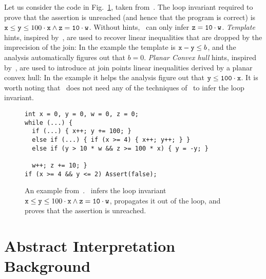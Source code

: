 \documentclass{llncs}
\begin{document}
 Let us consider the code in Fig.~\ref{fig:ex_paperSriramMS}, taken from~\cite{GulavaniEtAl08}.
The loop invariant required to prove that  the assertion  is unreached (and hence that the program is correct) is $\mathtt{x} \leq \mathtt{y} \leq 100 \cdot \mathtt{x} \wedge \mathtt{z} = \mathtt{10} \cdot \mathtt{w}$.
Without hints, \Subpoly\ can only infer  $\mathtt{z} = \mathtt{10 \cdot w}$.
\emph{Template} hints, inspired by~\cite{Sankaranarayanan05}, are used to recover linear inequalities that are dropped by the imprecision of the join: In the example the template is $\mathtt{x} - \mathtt{y} \leq b$, and the analysis automatically figures out that $b = 0$.
\emph{Planar Convex hull} hints, inspired by~\cite{SimonKing02-2}, are used to introduce at join points linear inequalities derived by a planar convex hull: In the example it helps the analysis figure out that $\mathtt{y} \leq \mathtt{100} \cdot \mathtt{x}$.
It is worth noting that \Subpoly\ does not need any of the techniques of~\cite{GulavaniEtAl08} to infer the loop invariant.

\begin{figure}[t]
{
\small
\begin{verbatim}
int x = 0, y = 0, w = 0, z = 0;
while (...) {
  if (...) { x++; y += 100; }
  else if (...) { if (x >= 4) { x++; y++; } }
  else if (y > 10 * w && z >= 100 * x) { y = -y; }
        
  w++; z += 10; }
if (x >= 4 && y <= 2) Assert(false); 
\end{verbatim}
}
\vspace{-0.2cm}
\caption{An example from~\cite{GulavaniEtAl08}. \Subpoly\ infers the loop invariant $\mathtt{x} \leq \mathtt{y} \leq 100 \cdot \mathtt{x} \wedge \mathtt{z} = \mathtt{10} \cdot \mathtt{w}$, propagates it out of the loop, and proves that the assertion is unreached.}
\label{fig:ex_paperSriramMS}
\vspace{-0.2cm}
\end{figure}


\section{Abstract Interpretation Background}
\end{document}
